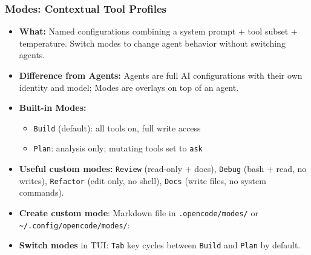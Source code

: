 \begin{frame}[fragile]\frametitle{Modes:  Contextual Tool Profiles}
  \begin{itemize}
    \item \textbf{What:} Named configurations combining a system prompt + tool subset + temperature. Switch modes to change agent behavior without switching agents.
    \item \textbf{Difference from Agents:} Agents are full AI configurations with their own identity and model; Modes are overlays on top of an agent.
    \item \textbf{Built-in Modes:}
      \begin{itemize}
        \item \texttt{Build} (default):  all tools on, full write access
        \item \texttt{Plan}:  analysis only; mutating tools set to \texttt{ask}
      \end{itemize}
    \item \textbf{Useful custom modes:} \texttt{Review} (read-only + docs), \texttt{Debug} (bash + read, no writes), \texttt{Refactor} (edit only, no shell), \texttt{Docs} (write files, no system commands).
    \item \textbf{Create custom mode}:  Markdown file in \texttt{.opencode/modes/} or \texttt{\textasciitilde/.config/opencode/modes/}:

    \item \textbf{Switch modes} in TUI: \texttt{Tab} key cycles between \texttt{Build} and \texttt{Plan} by default.
  \end{itemize}
  

\end{frame}

